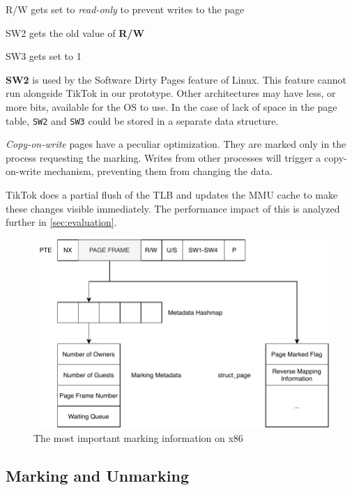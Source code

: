 \documentclass[conference]{IEEEtran}
\newcommand{\sysname}{TikTok}
\begin{document}
\begin{LaTeXdescription}
  \item[R/W] gets set to \emph{read-only} to prevent writes to the page
  \item[SW2] gets the old value of \textbf{R/W}
  \item[SW3] gets set to 1 
\end{LaTeXdescription}

\textbf{SW2} is used by the Software Dirty Pages
feature of Linux. This feature cannot run alongside \sysname{} in our prototype.
Other architectures may have less, or more bits, available for the OS to use. In
the case of lack of space in the page table, \texttt{SW2} and \texttt{SW3} could
be stored in a separate data structure.

\emph{Copy-on-write} pages have a peculiar optimization. They are marked only in
the process requesting the marking. Writes from other processes will trigger a
copy-on-write mechanism, preventing them from changing the data.

\sysname{} does a partial flush of the TLB and updates the MMU cache to make these
changes visible immediately. The performance impact of this is analyzed further
in \autoref{sec:evaluation}.

\begin{figure}[]
  \centering
  \includegraphics[width=\linewidth]{img/book-keeping.pdf}
  \caption{The most important marking information on x86}
  \label{fig:bookkeeping}
\end{figure}

\subsection{Marking and Unmarking}
\end{document}
